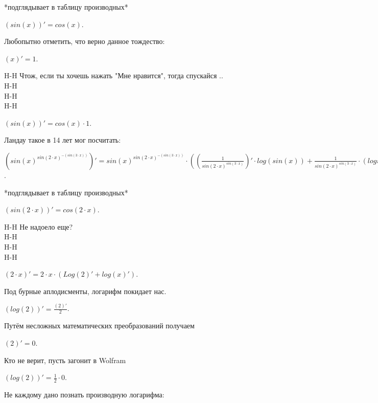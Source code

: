 \documentclass{article}
\begin{document}
*подглядывает в таблицу производных*\\
\begin{center}$(sin(x))'= cos(x)$.\end{center}
Любопытно отметить, что верно данное тождество:\\
\begin{center}$(x)' = 1$.\end{center}
H-H Чтож, если ты хочешь нажать "Мне нравится", тогда спускайся ..\\
H-H\\
H-H\\
H-H\\
\begin{center}$(sin(x))'= cos(x) \cdot {1}$.\end{center}
Ландау такое в 14 лет мог посчитать:\\
\begin{center}$({sin(x)^{sin({2} \cdot x)^{-(sin({3} \cdot x))}}})'={sin(x)^{sin({2} \cdot x)^{-(sin({3} \cdot x))}}} \cdot (( \frac {1} {{sin({2} \cdot x)} ^ {sin({3} \cdot x)}})'\cdot log(sin(x)) +  \frac {1} {{sin({2} \cdot x)} ^ {sin({3} \cdot x)}} \cdot (logsin(x))')$.\end{center}
*подглядывает в таблицу производных*\\
\begin{center}$(sin({2} \cdot x))'= cos({2} \cdot x)$.\end{center}
H-H Не надоело еще?\\
H-H\\
H-H\\
H-H\\
\begin{center}$({2} \cdot x)'={2} \cdot x\cdot (Log({2})' + log(x)')$.\end{center}
Под бурные аплодисменты, логарифм покидает нас.\\
\begin{center}$(log({2}))'= \frac { ({2})'} {{2}}$.\end{center}
Путём несложных математических преобразований получаем\\
\begin{center}$({2})' = 0$.\end{center}
Кто не верит, пусть загонит в Wolfram\\
\begin{center}$(log({2}))'=  \frac {1} {{{2}}} \cdot {0}$.\end{center}
Не каждому дано познать производную логарифма:\\
\end{document}
